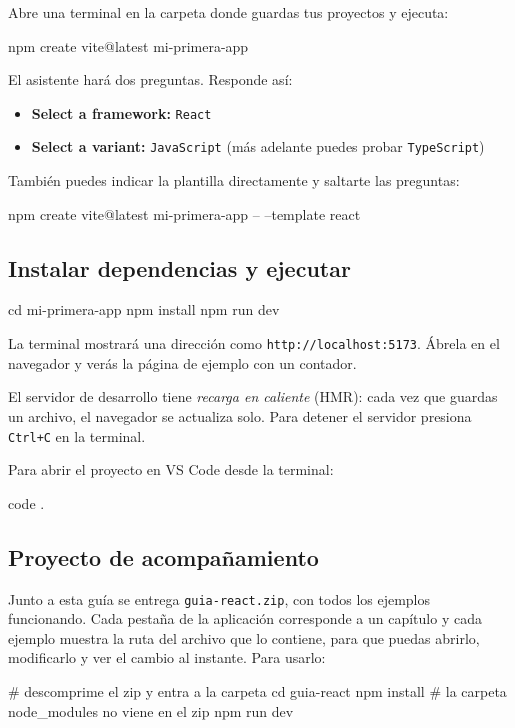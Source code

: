 \documentclass[11pt,a4paper]{article}
\newcommand{\cmd}[1]{\texttt{\color{reactdark}#1}}
\begin{document}
Abre una terminal en la carpeta donde guardas tus proyectos y ejecuta:
\begin{terminal}
npm create vite@latest mi-primera-app
\end{terminal}

El asistente hará dos preguntas. Responde así:
\begin{itemize}
  \item \textbf{Select a framework:} \cmd{React}
  \item \textbf{Select a variant:} \cmd{JavaScript} (más adelante puedes probar \cmd{TypeScript})
\end{itemize}

También puedes indicar la plantilla directamente y saltarte las preguntas:
\begin{terminal}
npm create vite@latest mi-primera-app -- --template react
\end{terminal}

\subsection{Instalar dependencias y ejecutar}

\begin{terminal}
cd mi-primera-app
npm install
npm run dev
\end{terminal}

La terminal mostrará una dirección como \cmd{http://localhost:5173}. Ábrela en el navegador y verás la página de ejemplo con un contador.

\begin{nota}
El servidor de desarrollo tiene \emph{recarga en caliente} (HMR): cada vez que guardas un archivo, el navegador se actualiza solo. Para detener el servidor presiona \cmd{Ctrl+C} en la terminal.
\end{nota}

Para abrir el proyecto en VS Code desde la terminal:
\begin{terminal}
code .
\end{terminal}

\subsection{Proyecto de acompañamiento}

Junto a esta guía se entrega \cmd{guia-react.zip}, con todos los ejemplos funcionando. Cada pestaña de la aplicación corresponde a un capítulo y cada ejemplo muestra la ruta del archivo que lo contiene, para que puedas abrirlo, modificarlo y ver el cambio al instante. Para usarlo:
\begin{terminal}
# descomprime el zip y entra a la carpeta
cd guia-react
npm install        # la carpeta node_modules no viene en el zip
npm run dev
\end{terminal}
\end{document}

